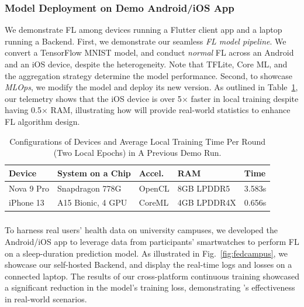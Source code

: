 \documentclass[conference]{IEEEtran}
\begin{document}
\subsubsection{Model Deployment on Demo Android/iOS App}
We demonstrate FL among
devices running a Flutter client app
and a laptop running a \FedKit{} Backend.
First, we demonstrate our seamless \textit{FL model pipeline}.
We convert a TensorFlow MNIST model,
and conduct \textit{normal} FL across an Android and an iOS device,
despite the heterogeneity.
Note that TFLite, Core ML, and the aggregation strategy determine the model
performance.
Second, to showcase \textit{MLOps},
we modify the model and deploy its new version.
As outlined in Table~\ref{tbl:demo-stats},
our telemetry shows that
the iOS device is over 5$\times$ faster in local training despite
having 0.5$\times$ RAM,
illustrating how \FedKit{} will provide real-world statistics to
enhance FL algorithm design.

\begin{table}
    \centering
    \setlength{\tabcolsep}{4pt}
\begin{tabular}{lllll}
Device      & System on a Chip  & Accel.        & RAM           & Time   \\\hline
Nova 9 Pro  & Snapdragon 778G   & OpenCL        & 8GB LPDDR5    & 3.583s \\
iPhone 13   & A15 Bionic, 4 GPU & CoreML        & 4GB LPDDR4X   & 0.656s \\
\end{tabular}
\caption{Configurations of Devices and Average Local Training Time Per Round
    (Two Local Epochs) in A Previous Demo Run.
}
\label{tbl:demo-stats}
    \vspace{-2mm}
\end{table}

\subsubsection{\FedCampus{}}
To harness real users' health data on university campuses,
we developed the \FedCampus{} Android/iOS app to leverage data from
participants' smartwatches to perform FL on
a sleep-duration prediction model.
As illustrated in Fig.~\ref{fig:fedcampus},
we showcase our self-hosted Backend,
and display the real-time logs and losses on a connected laptop.
The results of our cross-platform continuous training showcased
a significant reduction in the model's training loss,
demonstrating \FedKit{}'s effectiveness in real-world scenarios.
\end{document}
